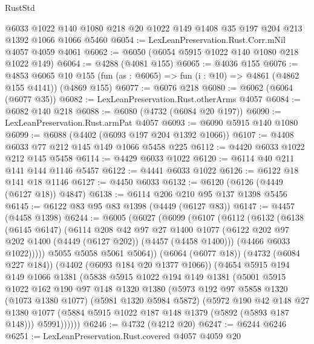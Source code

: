 \begin{lexlean}{RustStd}
\begin{coremodule}
{\begin{coremodule}
{{{{{{{{{{{{{{    @6033
    @1022
    @140
    @1080
    @218
    @20
    @1022
    @149
    @1408
    @35
    @197
    @204
    @213
    @1392
    @1066
    @1066
    @5460
@6054 := LexLeanPreservation.Rust.Corr.mNil @4057 @4059 @4061
@6062 := @6050 (@6054 @5915 @1022 @140 @1080 @218 @1022 @149)
@6064 := @4288 (@4081 @155)
@6065 := @4036 @155
@6076 := @4853
    @6065
    @10
    @155
    (fun (as : @6065) => fun (i : @10) => @4861 (@4862 @155 @4141))
    (@4869 @155)
@6077 := @6076 @218
@6080 := @6062 (@6064 (@6077 @35))
@6082 := LexLeanPreservation.Rust.otherArms @4057
@6084 := @6082 @140 @218
@6088 := @6080 (@4732 (@6084 @20 @197))
@6090 := LexLeanPreservation.Rust.armPat @4057
@6093 := @6090 @5915 @140 @1080
@6099 := @6088 (@4402 (@6093 @197 @204 @1392 @1066))
@6107 := @4408 @6033 @77 @212 @145 @149 @1066 @5458 @225
@6112 := @4420 @6033 @1022 @212 @145 @5458
@6114 := @4429 @6033 @1022
@6120 := @6114 @40 @211 @141 @144 @1146 @5457
@6122 := @4441 @6033 @1022
@6126 := @6122 @18 @141 @18 @1146
@6127 := @4450 @6033
@6132 := @6120 (@6126 (@4449 (@6127 @18)) @4847)
@6138 := @6114 @206 @210 @95 @137 @1398 @5456
@6145 := @6122 @83 @95 @83 @1398 (@4449 (@6127 @83))
@6147 := @4457 (@4458 @1398)
@6244 := @6005
    (@6027
      (@6099
        (@6107
          (@6112
            (@6132
              (@6138
                (@6145 @6147)
                (@6114
                  @208
                  @42
                  @97
                  @27
                  @1400
                  @1077
                  (@6122 @202 @97 @202 @1400 (@4449 (@6127 @202)) (@4457 (@4458 @1400)))
                  (@4466 @6033 @1022)))))
          @5055
          @5058
          @5061
          @5064))
      (@6064 (@6077 @18))
      (@4732 (@6084 @227 @184))
      (@4402 (@6093 @184 @20 @1377 @1066))
      (@4654
        @5915
        @194
        @149
        @1066
        @1381
        (@5838
          @5915
          @1022
          @194
          @149
          @1381
          (@5001
            @5915
            @1022
            @162
            @190
            @97
            @148
            @1320
            @1380
            (@5973
              @192
              @97
              @5858
              @1320
              (@1073 @1380 @1077)
              (@5981 @1320 @5984 @5872)
              (@5972
                @190
                @42
                @148
                @27
                @1380
                @1077
                (@5884 @5915 @1022 @187 @148 @1379 (@5892 (@5893 @187 @148)))
                @5991))))))
@6246 := @4732 (@4212 @20)
@6247 := @6244 @6246
@6251 := LexLeanPreservation.Rust.covered @4057 @4059 @20
}}}}}}}}}}}}}}
\end{coremodule}}
\end{coremodule}
\end{lexlean}
